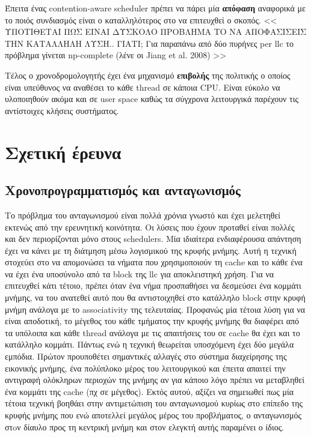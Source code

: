 Έπειτα ένας contention-aware scheduler πρέπει να πάρει μία \textbf{απόφαση}
αναφορικά με το ποιός συνδιασμός είναι ο καταλληλότερος στο να επιτευχθεί ο
σκοπός. << ΥΠΟΤΙΘΕΤΑΙ ΠΩΣ ΕΙΝΑΙ ΔΥΣΚΟΛΟ ΠΡΟΒΛΗΜΑ ΤΟ ΝΑ ΑΠΟΦΑΣΙΣΕΙΣ ΤΗΝ ΚΑΤΑΛΛΗΛΗ
ΛΥΣΗ.. ΓΙΑΤΙ; Για παραπάνω από δύο πυρήνες per llc το πρόβλημα γίνεται
np-complete (λένε οι Jiang et al. 2008) >>

Τέλος ο χρονοδρομολογητής έχει ένα μηχανισμό \textbf{επιβολής} της πολιτικής ο
οποίος είναι υπεύθυνος να αναθέσει το κάθε thread σε κάποια CPU. Είναι εύκολο να
υλοποιηθούν ακόμα και σε user space καθώς τα σύγχρονα λειτουργικά παρέχουν τις
αντίστοιχες κλήσεις συστήματος.

\section{Σχετική έρευνα}
\subsection{Χρονοπρογραμματισμός και ανταγωνισμός}
Το πρόβλημα του ανταγωνισμού είναι πολλά χρόνια γνωστό και έχει μελετηθεί
εκτενώς από την ερευνητική κοινότητα. Οι λύσεις που έχουν προταθεί είναι πολλές
και δεν περιορίζονται μόνο στους schedulers. Μία ιδιαίτερα ενδιαφέρουσα απάντηση
έχει να κάνει με τη διάτμηση μέσω λογισμικού της κρυφής μνήμης. Αυτή η τεχνική
στοχεύει στο να απομονώσει τα νήματα που χρησιμοποιούν τη cache και το κάθε ένα
να έχει ένα υποσύνολο από τα block της llc για αποκλειστηκή χρήση. Για να
επιτευχθεί κάτι τέτοιο, πρέπει όταν ένα νήμα προσπαθήσει να δεσμεύσει ένα
κομμάτι μνήμης, να του ανατεθεί αυτό που θα αντιστοιχηθεί στο κατάλληλο block
στην κρυφή μνήμη ανάλογα με το associativity της τελευταίας. Προφανώς μία τέτοια
λύση για να είναι αποδοτική, το μέγεθος του κάθε τμήματος την κρυφής μνήμης θα
διαφέρει από τα υπόλοιπα και κάθε thread ανάλογα με τις απαιτήσεις του σε cache
θα έχει και το κατάλληλο κομμάτι. Πάντως ενώ η τεχνική θεωρείται υποσχόμενη έχει
δύο μεγάλα εμπόδια. Πρώτον προυποθέτει σημαντικές αλλαγές στο σύστημα
διαχείρησης της εικονικής μνήμης, ένα πολύπλοκο μέρος του λειτουργικού και
έπειτα απαιτεί την αντιγραφή ολόκληρων περιοχών της μνήμης αν για κάποιο λόγο
πρέπει να μεταβληθεί ένα κομμάτι της cache (πχ σε μέγεθος). Εκτός αυτού, αξίζει
να σημειωθεί πως μία τέτοια τεχνική βοηθάει στην αντιμετώπιση του ανταγωνισμού
κυρίως στο επίπεδο της κρυφής μνήμης που ενώ αποτελλεί μεγάλος μέρος του
προβλήματος, ο ανταγωνισμός στoν δίαυλο προς τη κεντρική μνήμη και στον ελεγκτή
αυτής παραμένει ο ίδιος.

